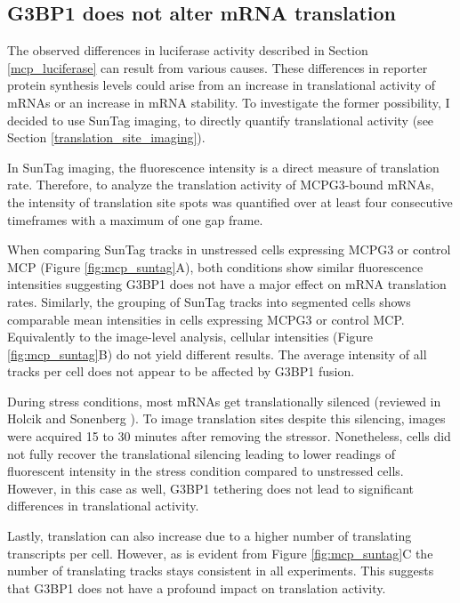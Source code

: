 \subsection{G3BP1 does not alter mRNA translation}\label{mcp_suntag}

The observed differences in luciferase activity described in Section \ref{mcp_luciferase} can result from various causes.
These differences in reporter protein synthesis levels could arise from an increase in translational activity of mRNAs or an increase in mRNA stability.
To investigate the former possibility, I decided to use SunTag imaging, to directly quantify translational activity (see Section \ref{translation_site_imaging}).

In SunTag imaging, the fluorescence intensity is a direct measure of translation rate.
Therefore, to analyze the translation activity of MCPG3-bound mRNAs, the intensity of translation site spots was quantified over at least four consecutive timeframes with a maximum of one gap frame.

When comparing SunTag tracks in unstressed cells expressing MCPG3 or control MCP (Figure \ref{fig:mcp_suntag}A), both conditions show similar fluorescence intensities suggesting G3BP1 does not have a major effect on mRNA translation rates.
Similarly, the grouping of SunTag tracks into segmented cells shows comparable mean intensities in cells expressing MCPG3 or control MCP.
Equivalently to the image-level analysis, cellular intensities (Figure \ref{fig:mcp_suntag}B) do not yield different results.
The average intensity of all tracks per cell does not appear to be affected by G3BP1 fusion.

During stress conditions, most mRNAs get translationally silenced (reviewed in Holcik and Sonenberg \cite{holcik_translational_2005}).
To image translation sites despite this silencing, images were acquired 15 to 30 minutes after removing the stressor.
Nonetheless, cells did not fully recover the translational silencing leading to lower readings of fluorescent intensity in the stress condition compared to unstressed cells.
However, in this case as well, G3BP1 tethering does not lead to significant differences in translational activity.

Lastly, translation can also increase due to a higher number of translating transcripts per cell.
However, as is evident from Figure \ref{fig:mcp_suntag}C the number of translating tracks stays consistent in all experiments.
This suggests that G3BP1 does not have a profound impact on translation activity.

